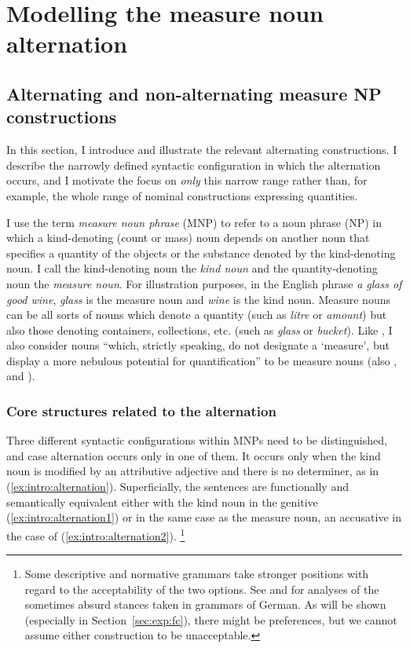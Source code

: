 \section{Modelling the measure noun alternation}
\label{sec:germanmeasurenps}

\subsection{Alternating and non-alternating measure NP constructions}
\label{sec:descriptive}

In this section, I introduce and illustrate the relevant alternating constructions.
I describe the narrowly defined syntactic configuration in which the alternation occurs, and I motivate the focus on \textit{only} this narrow range rather than, for example, the whole range of nominal constructions expressing quantities.

I use the term \textit{measure noun phrase} (MNP) to refer to a noun phrase (NP) in which a kind-denoting (count or mass) noun depends on another noun that specifies a quantity of the objects or the substance denoted by the kind-denoting noun.
I call the kind-denoting noun the \textit{kind noun} and the quantity-denoting noun the \textit{measure noun}.
For illustration purposes, in the English phrase \textit{a glass of good wine}, \textit{glass} is the measure noun and \textit{wine} is the kind noun.
Measure nouns can be all sorts of nouns which denote a quantity (such as \textit{litre} or \textit{amount}) but also those denoting containers, collections, etc. (such as \textit{glass} or \textit{bucket}).
Like \citet[284]{Brems2003}, I also consider nouns ``which, strictly speaking, do not designate a `measure', but display a more nebulous potential for quantification'' to be measure nouns (also \citealp[530]{Koptjevskaja2001}, and \citealp[338]{Rutkowski2007}).

\subsubsection{Core structures related to the alternation}

Three different syntactic configurations within MNPs need to be distinguished, and case alternation occurs only in one of them.
It occurs only when the kind noun is modified by an attributive adjective and there is no determiner, as in (\ref{ex:intro:alternation}).
Superficially, the sentences are functionally and semantically equivalent either with the kind noun in the genitive (\ref{ex:intro:alternation1}) or in the same case as the measure noun, an accusative in the case of (\ref{ex:intro:alternation2}).%
\footnote{Some descriptive and normative grammars take stronger positions with regard to the acceptability of the two options.
See \cite{Hentschel1993} and \cite{Zimmer2015} for analyses of the sometimes absurd stances taken in grammars of German.
As will be shown (especially in Section~\ref{sec:exp:fc}), there might be preferences, but we cannot assume either construction to be unacceptable.
}

